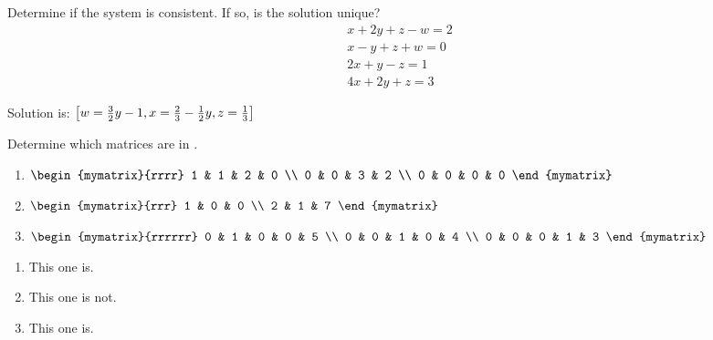 \begin{enumialphparenastyle}
\begin{ex}
Determine if the system is consistent. If so, is the solution unique? 
\begin{equation*}
\begin{array}{c}
x+2y+z-w=2 \\
x-y+z+w=0 \\
2x+y-z=1 \\
4x+2y+z=3
\end{array}
\end{equation*}
\begin{sol}
Solution is: $\left[w=\frac{3}{2}y-1,x=\frac{2}{3}-\frac{1}{2}y,z=\frac{1}{3
}\right] $
\end{sol}
\end{ex}

\begin{ex} Determine which matrices are in {\ef}. 

\begin{enumerate}
\item $\begin{mymatrix}{rrrr}
1 & 1 & 2 & 0 \\
0 & 0 & 3 & 2 \\
0 & 0 & 0 & 0
\end{mymatrix} $

\item $\begin{mymatrix}{rrr}
1 & 0 & 0 \\
2 & 1 & 7
\end{mymatrix} $

\item $\begin{mymatrix}{rrrrrr}
0 & 1 & 0 & 0 & 5 \\
0 & 0 & 1 & 0 & 4 \\
0 & 0 & 0 & 1 & 3
\end{mymatrix} $
\end{enumerate}
\begin{sol}
\begin{enumerate}
\item This one is.
\item This one is not.
\item This one is.
\end{enumerate}
\end{sol}
\end{ex}


\end{enumialphparenastyle}
